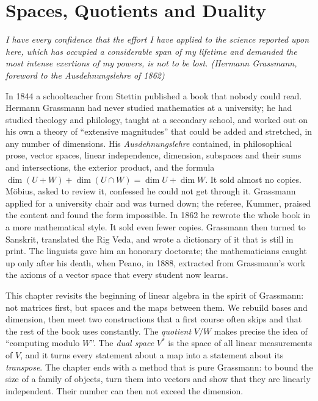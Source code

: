 \chapter{Spaces, Quotients and Duality}\label{linear:ch:duality}

\begin{center}\itshape
I have every confidence that the effort I have applied to the science reported upon here, which has occupied a
considerable span of my lifetime and demanded the most intense exertions of my powers, is not to be lost.
\upshape(Hermann Grassmann, foreword to the \emph{Ausdehnungslehre} of 1862)
\end{center}

In 1844 a schoolteacher from Stettin published a book that nobody could read. Hermann Grassmann had never studied
mathematics at a university; he had studied theology and philology, taught at a secondary school, and worked out on his
own a theory of ``extensive magnitudes'' that could be added and stretched, in any number of dimensions. His
\emph{Ausdehnungslehre} contained, in philosophical prose, vector spaces, linear independence, dimension, subspaces and
their sums and intersections, the exterior product, and the formula $\dim(U+W)+\dim(U\cap W)=\dim U+\dim W$. It sold
almost no copies. M\"obius, asked to review it, confessed he could not get through it. Grassmann applied for a
university chair and was turned down; the referee, Kummer, praised the content and found the form impossible. In 1862 he rewrote the whole book in a more mathematical style. It sold even fewer copies. Grassmann
then turned to Sanskrit, translated the Rig Veda, and wrote a dictionary of it that is still in print. The linguists
gave him an honorary doctorate; the mathematicians caught up only after his death, when Peano, in 1888, extracted from
Grassmann's work the axioms of a vector space that every student now learns.

This chapter revisits the beginning of linear algebra in the spirit of Grassmann: not matrices first, but spaces and
the maps between them. We rebuild bases and dimension, then meet two constructions that a first course often skips and
that the rest of the book uses constantly. The \emph{quotient} $V/W$ makes precise the idea of ``computing modulo $W$''.
The \emph{dual space} $V^*$ is the space of all linear measurements of $V$, and it turns every statement about a map into
a statement about its \emph{transpose}. The chapter ends with a method that is pure Grassmann: to bound the size of a
family of objects, turn them into vectors and show that they are linearly independent. Their number can then not
exceed the dimension.

